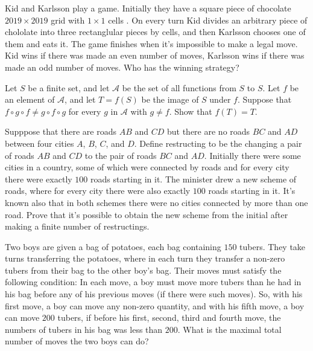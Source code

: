 \documentclass[11pt]{scrartcl}
\begin{document}
\begin{problem}[300334293164389]
	Kid and Karlsson play a game. Initially they have a square piece of chocolate $2019\times 2019$ grid with $1\times 1$ cells . On every turn Kid divides an arbitrary piece of chololate into three rectanglular pieces by cells, and then Karlsson chooses one of them and eats it. The game finishes when it's impossible to make a legal move. Kid wins if there was made an even number of moves, Karlsson wins if there was made an odd number of moves.
Who has the winning strategy?
\end{problem}
\begin{problem}[284766145954043]
Let $S$ be a finite set, and let $\mathcal{A}$ be the set of all functions from $S$ to $S$. Let $f$ be an element of $\mathcal{A}$, and let $T=f(S)$ be the image of $S$ under $f$. Suppose that $f\circ g\circ f\ne g\circ f\circ g$ for every $g$ in $\mathcal{A}$ with $g\ne f$. Show that $f(T)=T$.
\end{problem}
\begin{problem}[4875666253256352039]
Supppose that there are roads $AB$ and $CD$ but there are no roads $BC$ and $AD$ between four cities $A$, $B$, $C$, and $D$. Define restructing to be the changing a pair of roads $AB$ and $CD$ to the pair of roads $BC$ and $AD$. Initially there were some cities in a country, some of which were connected by roads and for every city there were exactly $100$ roads starting in it. The minister drew a new scheme of roads, where for every city there were also exactly $100$ roads starting in it. It's known also that in both schemes there were no cities connected by more than one road.
Prove that it's possible to obtain the new scheme from the initial after making a finite number of restructings.
\end{problem}
\begin{problem}[326164407850848]
Two boys are given a bag of potatoes, each bag containing $150$ tubers. They take turns transferring the potatoes, where in each turn they transfer a non-zero tubers from their bag to the other boy's bag. Their moves must satisfy the following condition: In each move, a boy must move more tubers than he had in his bag before any of his previous moves (if there were such moves). So, with his first move, a boy can move any non-zero quantity, and with his fifth move, a boy can move $200$ tubers, if before his first, second, third and fourth move, the numbers of tubers in his bag was less than $200$. What is the maximal total number of moves the two boys can do?
\end{problem}
\end{document}
